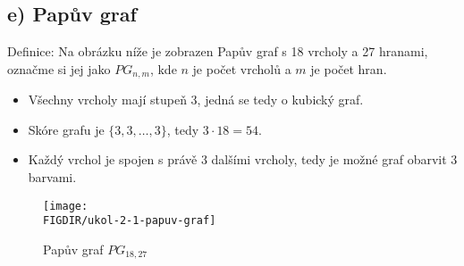 \documentclass[10pt, a4paper]{ReportSheet}
\begin{document}
\begin{uloha}{1}{2}

        \subsection{e) Papův graf}
        \label{subsec:ukol-2-1e-papuv-graf}
        Definice: Na obrázku níže je zobrazen Papův graf s 18 vrcholy a 27 hranami, označme si jej jako $PG_{n, m}$, kde $
        n$ je počet vrcholů a $m$ je počet hran.

        \begin{itemize}
            \item Všechny vrcholy mají stupeň 3, jedná se tedy o kubický graf.
            \item Skóre grafu je $\{3, 3, \dots, 3\}$, tedy $3 \cdot 18 = 54$.
            \item Každý vrchol je spojen s právě 3 dalšími vrcholy, tedy je možné graf obarvit 3 barvami.
        \end{itemize}

        \begin{figure}[H]
            \centering
            \texttt{[image: \\FIGDIR/ukol-2-1-papuv-graf]}
            \caption{Papův graf $PG_{18, 27}$}
            \label{fig:ukol-2-1-papuv-graf}\label{fig:figure}
        \end{figure}

    \end{uloha}
\end{document}
